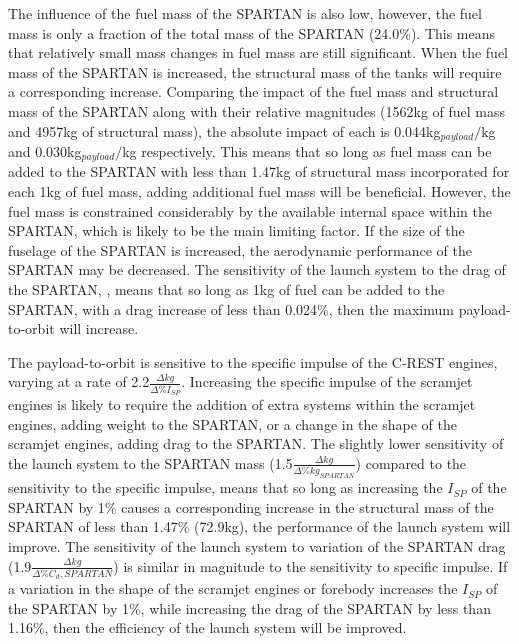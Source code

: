 The influence of the fuel mass of the SPARTAN is also low, however, the fuel mass is only a fraction of the total mass of the SPARTAN (24.0\%). This means that relatively small mass changes in fuel mass are still significant. 
When the fuel mass of the SPARTAN is increased, the structural mass of the tanks will require a corresponding increase. 
Comparing the impact of the fuel mass and structural mass of the SPARTAN along with their relative magnitudes (1562kg of fuel mass and 4957kg of structural mass), the absolute impact of each is 0.044kg$_{payload}/$kg and 0.030kg$_{payload}/$kg respectively. This means that so long as fuel mass can be added to the SPARTAN with less than 1.47kg of structural mass incorporated for each 1kg of fuel mass, adding additional fuel mass will be beneficial. However, the fuel mass is constrained considerably by the available internal space within the SPARTAN, which is likely to be the main limiting factor.
If the size of the fuselage of the SPARTAN is increased, the aerodynamic performance of the SPARTAN may be decreased. 
The sensitivity of the launch system to the drag of the SPARTAN, , means that so long as 1kg of fuel can be added to the SPARTAN, with a drag increase of less than 0.024\%, then the maximum payload-to-orbit will increase. 


The payload-to-orbit is sensitive to the specific impulse of the C-REST engines, varying at a rate of 2.2$\frac{\Delta kg}{\Delta\%I_{SP}}$. Increasing the specific impulse of the scramjet engines is likely to require the addition of extra systems within the scramjet engines, adding weight to the SPARTAN, or a change in the shape of the scramjet engines, adding drag to the SPARTAN. 
The slightly lower sensitivity of the launch system to the SPARTAN mass (1.5$\frac{\Delta kg}{\Delta\%kg_{SPARTAN}}$) compared to the sensitivity to the specific impulse, means that so long as increasing the $I_{SP}$ of the SPARTAN by 1\% causes a corresponding increase in the structural mass of the SPARTAN of less than 1.47\% (72.9kg), the performance of the launch system will improve. 
The sensitivity of the launch system to variation of the SPARTAN drag (1.9$\frac{\Delta kg}{\Delta\%C_d,{SPARTAN}}$) is similar in magnitude to the sensitivity to specific impulse. 
If a variation in the shape of the scramjet engines or forebody increases the $I_{SP}$ of the SPARTAN by 1\%, while increasing the drag of the SPARTAN by less than 1.16\%, then the efficiency of the launch system will be improved. 



